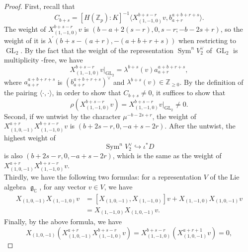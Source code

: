\documentclass[11pt, a4paper]{amsart}
\theoremstyle{plain}
\theoremstyle{definition}
\numberwithin{equation}{section}
\def\CC{\mathbb{C}}
\def\ZZ{\mathbb{Z}}
\DeclareMathOperator{\Sym}{Sym}
\DeclareMathOperator{\GL}{\mathrm{GL}}
\DeclareMathOperator{\lieg}{\mathfrak g}
\newcommand{\Zp}{\ZZ_p}
\begin{document}
\begin{proof}
    First, recall that
    \begin{equation*}
        C_{b + s} = [H(\Zp): K]^{-1} \langle X^{b + s - r}_{(1, -1, 0)}v, b^{a + b + r + s}_{a + r} \rangle. 
    \end{equation*}
    The weight of $X^{b + s - r}_{(1, -1, 0)}v$ is $(b - a + 2(s - r), 0, s - r; -b -2s + r)$, so the weight of it is $\lambda^{\prime}(b + s - (a + r), -(a + b + r + s))$ when restricting to $\GL_2$. By the fact that the weight of the representation $\Sym^{n}V_2^{\vee}$ of $\GL_2$ is multiplicity -free, we have 
    \begin{equation*}
        X^{b + s - r}_{(1, -1, 0)}v|_{\GL_2} = \lambda^{b+s}(v) a^{a + b + r + s}_{a + r},
    \end{equation*}
    where $a^{a + b + r + s}_{a + r}$ is $(b^{a + b + r +s}_{a + r})^{\vee}$ and $\lambda^{b+s}(v) \in \ZZ_{\ge 0}$.
    By the definition of the pairing $\langle \cdot, \cdot \rangle$, in order to show that $C_{b + s} \neq 0$, it suffices to show that 
    \begin{equation*}
         \rho(X^{b + s - r}_{(1, -1, 0)}v) = X^{b + s - r}_{(1, -1, 0)}v|_{\GL_2} \neq 0. 
    \end{equation*}
    Second, if we untwist by the character $\mu^{-b - 2s + r}$,  the weight of $X^{a + r}_{(1, 0, -1)}X^{b + s - r}_{(1, -1, 0)}v$ is $(b + 2s - r, 0, -a + s - 2r)$. After the untwist, the highest weight of 
    \begin{equation*}
        \Sym^{n}V_{2}^{\vee} \hookrightarrow \iota^{*}D
    \end{equation*}
    is also $(b + 2s - r, 0, -a + s - 2r)$, which is the same as the weight of $X^{a + r}_{(1, 0, -1)}X^{b + s - r}_{(1, -1, 0)}v$. \\
    Thirdly, we have the following two formulas: for a representation $V$ of the Lie algebra $\lieg_{\CC}$, for any vector $v \in V$, 
    we have
    \begin{align*}
        X_{(1, 0, -1)}X_{(1, -1, 0)}v &= [X_{(1, 0, -1)}, X_{(1, -1, 0)}]v + X_{(1, -1, 0)}X_{(1, 0, -1)}v \\
                                      &= X_{(1, -1, 0)}X_{(1, 0, -1)}v.
    \end{align*}
    Finally, by the above formula, we have 
    \begin{equation*}
        X_{(1, 0, -1)}(X^{a + r}_{(1, 0, -1)}X^{b + s - r}_{(1, -1, 0)}v) = X^{b + s - r}_{(1, -1, 0)}(X_{(1, 0, -1)}^{a + r + 1} v) = 0,
    \end{equation*}

\end{proof}
\end{document}

